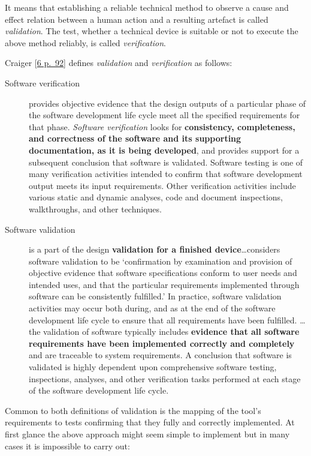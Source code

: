 It means that establishing a reliable technical method to observe a
cause and effect relation between a human action and a resulting
artefact is called \emph{validation}. The test, whether a technical
device is suitable or not to execute the above method reliably, is
called \emph{verification}.

Craiger {[}\protect\hyperlink{craiger2006}{6 p.~92}{]} defines
\emph{validation} and \emph{verification} as follows:

\begin{description}
\item[Software verification]
provides objective evidence that the design outputs of a particular
phase of the software development life cycle meet all the specified
requirements for that phase. \emph{Software verification} looks for
\textbf{consistency, completeness, and correctness of the software and
its supporting documentation, as it is being developed}, and provides
support for a subsequent conclusion that software is validated. Software
testing is one of many verification activities intended to confirm that
software development output meets its input requirements. Other
verification activities include various static and dynamic analyses,
code and document inspections, walkthroughs, and other techniques.
\item[Software validation]
is a part of the design \textbf{validation for a finished
device}\ldots{}​considers software validation to be `confirmation by
examination and provision of objective evidence that software
specifications conform to user needs and intended uses, and that the
particular requirements implemented through software can be consistently
fulfilled.' In practice, software validation activities may occur both
during, and as at the end of the software development life cycle to
ensure that all requirements have been fulfilled. \ldots{}​the
validation of software typically includes \textbf{evidence that all
software requirements have been implemented correctly and completely}
and are traceable to system requirements. A conclusion that software is
validated is highly dependent upon comprehensive software testing,
inspections, analyses, and other verification tasks performed at each
stage of the software development life cycle.
\end{description}

Common to both definitions of validation is the mapping of the tool's
requirements to tests confirming that they fully and correctly
implemented. At first glance the above approach might seem simple to
implement but in many cases it is impossible to carry out:


